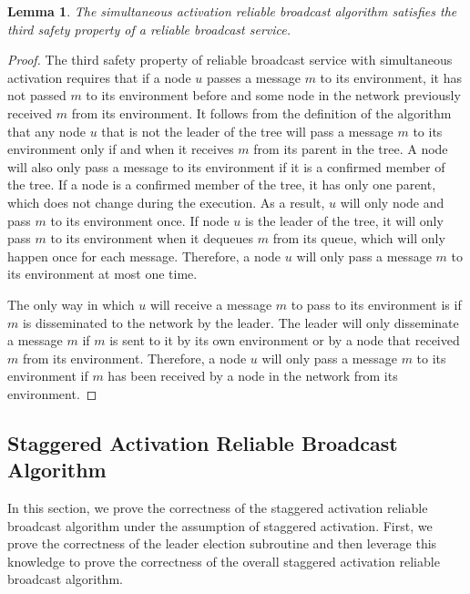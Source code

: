\documentclass[english]{article}
\newtheorem{lemma}[theorem]{Lemma}
\begin{document}
\begin{lemma}
\label{StaticRBSafety3}
The simultaneous activation reliable broadcast algorithm satisfies the third safety property of a reliable broadcast service.
\end{lemma}
\begin{proof}

The third safety property of reliable broadcast service with simultaneous activation requires that if a node $u$ passes a message $m$ to its environment, it has not passed $m$ to its environment before and some node in the network previously received $m$ from its environment. It follows from the definition of  the algorithm that any node $u$ that is not the leader of the tree will pass a message $m$ to its environment only if and when it receives $m$ from its parent in the tree. A node will also only pass a message to its environment if it is a confirmed member of the tree. If a node is a confirmed member of the tree, it has only one parent, which does not change during the execution. As a result, $u$ will only node and pass $m$ to its environment once. If node $u$ is the leader of the tree, it will only pass $m$ to its environment when it dequeues $m$ from its queue, which will only happen once for each message. Therefore, a node $u$ will only pass a message $m$ to its environment at most one time.

The only way in which $u$ will receive a message $m$ to pass to its environment is if $m$ is disseminated to the network by the leader. The leader will only disseminate a message $m$ if $m$ is sent to it by its own environment or by a node that received $m$ from its environment. Therefore, a node $u$ will only pass a message $m$ to its environment if $m$ has been received by a node in the network from its environment.

\end{proof}


\subsection {Staggered Activation Reliable Broadcast Algorithm}

In this section, we prove the correctness of the staggered activation reliable broadcast algorithm under the assumption of staggered activation. First, we prove the correctness of the leader election subroutine and then leverage this knowledge to prove the correctness of the overall staggered activation reliable broadcast algorithm.
\end{document}
